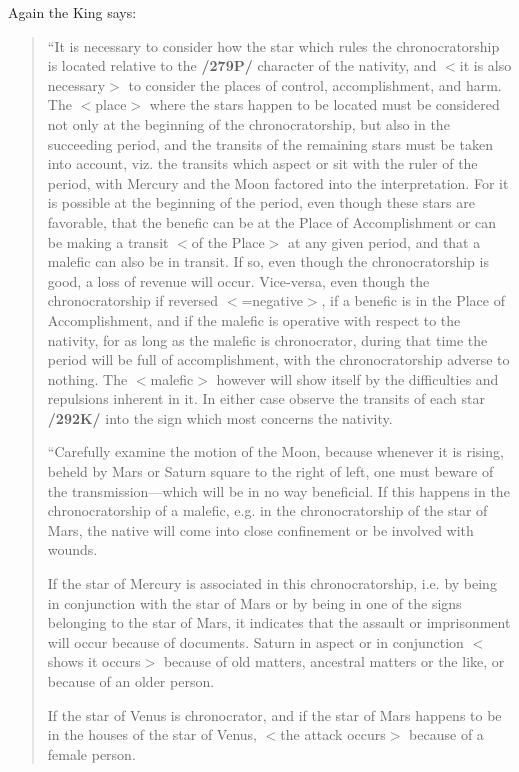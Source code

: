 Again the King says:
\begin{quote}
“It is necessary to consider how the star which rules the chronocratorship is located relative to the \textbf{/279P/} character of the nativity, and $<$it is also necessary$>$ to consider the places of control, accomplishment, and harm. The $<$place$>$ where the stars happen to be located must be considered not only at the beginning of the chronocratorship, but also in the succeeding period, and the transits of the remaining stars must be taken into account, viz. the transits which aspect or sit with the ruler of the period, with Mercury and the Moon factored into the interpretation. For it is possible at the
beginning of the period, even though these stars are favorable, that the benefic can be at the Place of Accomplishment or can be making a transit $<$of the Place$>$ at any given period, and that a malefic
can also be in transit. If so, even though the chronocratorship is good, a loss of revenue will occur. Vice-versa, even though the chronocratorship if reversed $<$=negative$>$, if a benefic is in the Place of Accomplishment, and if the malefic is operative with respect to the nativity, for as long as the malefic is chronocrator, during that time the period will be full of accomplishment, with the chronocratorship adverse to nothing. The $<$malefic$>$ however will show itself by the difficulties and repulsions inherent in it. In either case observe the transits of each star \textbf{/292K/} into the sign which most concerns the nativity.

“Carefully examine the motion of the Moon, because whenever it is rising, beheld by Mars or Saturn square to the right of left, one must beware of the transmission—which will be in no way beneficial. If this happens in the chronocratorship of a malefic, e.g. in the chronocratorship of the star of Mars, the native will come into close confinement or be involved with wounds. 

If the star of Mercury is associated in this chronocratorship, i.e. by being in conjunction with the star of Mars or by being in one of the signs belonging to the star of Mars, it indicates that the assault or imprisonment will occur because of documents. Saturn in aspect or in conjunction $<$shows it occurs$>$ because of old matters, ancestral matters or the like, or because of an older person. 

If the star of Venus is chronocrator, and if the star of Mars happens to be in the houses of the star of Venus, $<$the attack occurs$>$ because of a female person. 


\end{quote}
